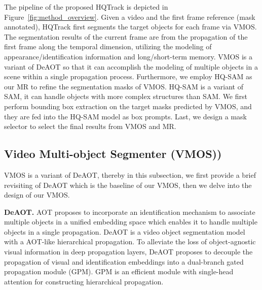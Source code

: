 \documentclass[10pt,twocolumn,letterpaper]{article}
\begin{document}
The pipeline of the proposed HQTrack is depicted in Figure~\ref{fig:method_overview}.
Given a video and the first frame reference (mask annotated), 
HQTrack first segments the target objects for each frame via VMOS.
The segmentation results of the current frame are from the propagation of the first frame along the temporal dimension, utilizing the modeling of appearance/identification information and long/short-term memory.
VMOS is a variant of DeAOT\cite{deaot} so that it can accomplish the modeling of multiple objects in a scene within a single propagation process.
Furthermore, we employ HQ-SAM\cite{sam_hq} as our MR to refine the segmentation masks of VMOS.
HQ-SAM is a variant of SAM\cite{sam}, it can handle objects with more complex structures than SAM.
We first perform bounding box extraction on the target masks predicted by VMOS, and they are fed into the HQ-SAM model as box prompts.
Last, we design a mask selector to select the final results from VMOS and MR.


\subsection{Video Multi-object Segmenter (VMOS))}
\label{sec:vmos}
VMOS is a variant of DeAOT\cite{deaot}, thereby in this subsection, we first provide a brief revisiting of DeAOT which is the baseline of our VMOS, then we delve into the design of our VMOS.

\noindent\textbf{DeAOT.}
AOT\cite{aot} proposes to incorporate an identification mechanism to associate multiple objects in a unified embedding space which enables it to handle multiple objects in a single propagation. 
DeAOT is a video object segmentation model with a AOT-like hierarchical propagation. To alleviate the loss of object-agnostic visual information in deep propagation layers, DeAOT proposes to decouple the propagation of visual and identification embeddings into a dual-branch gated propagation module (GPM).
GPM is an efficient module with single-head attention for constructing hierarchical propagation.
\end{document}
